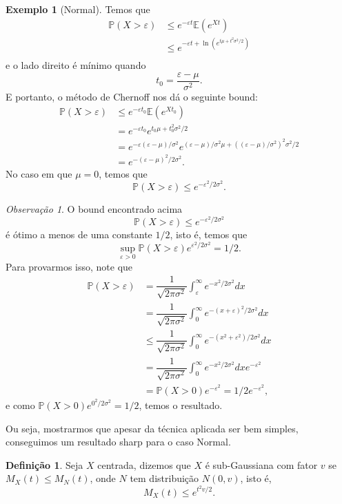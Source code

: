 \documentclass[12pt,a4paper,oneside]{book}
\theoremstyle{definition}
\newtheorem{definition}[theorem]{Defini\c{c}\~ao}
\newtheorem{example}[theorem]{Exemplo}
\theoremstyle{remark}
\newtheorem{remark}[theorem]{Observa\c{c}\~ao}
\numberwithin{equation}{section}
\newcommand{\e}{\varepsilon}
\newcommand{\E}{\mathbb{E}}
\newcommand{\pr}{\mathbb{P}}
\begin{document}
\begin{example}[Normal]
Temos que 
\begin{align*}
\pr(X>\e) & \leq  e^{-\e t}\E(e^{Xt})\\
	& \leq  e^{-\e t + \ln( e^{t\mu + t^2\sigma^2/2}) }\\
\end{align*} 
e o lado direito é mínimo quando 
$$t_0 = \dfrac{\e-\mu}{\sigma^2}.$$
E portanto, o método de Chernoff nos dá o seguinte bound:
\begin{align*}
\pr(X>\e) & \leq  e^{-\e t_0}\E(e^{Xt_0})\\
		& = e^{-\e t_0}e^{t_0\mu + t_0^2\sigma^2/2}\\
		& = e^{-\e (\e-\mu)/\sigma^2}e^{(\e-\mu)/\sigma^2\mu + ((\e-\mu)/\sigma^2)^2\sigma^2/2}\\
	& = e^{ -(\e-\mu)^2/2\sigma^2}.
\end{align*}
 No caso em que $\mu=0$, temos que
$$ \pr(X>\e) \leq e^{ -\e^2/2\sigma^2}.$$
\end{example}

\begin{tcolorbox}[colback = yellow!60]
\begin{remark}
O bound encontrado acima
$$ \pr(X>\e) \leq e^{ -\e^2/2\sigma^2}$$
é ótimo a menos de uma constante $1/2$, isto é, temos que
$$\sup_{\e>0} \pr(X>\e) e^{ \e^2/2\sigma^2} = 1/2.$$
Para provarmos isso, note que
\begin{align*}
\pr(X>\e) & = \dfrac{1}{\sqrt{2\pi \sigma^2}}\int_\e^\infty  e^{ -x^2/2\sigma^2}dx \\
& = \dfrac{1}{\sqrt{2\pi \sigma^2}}\int^\infty_0  e^{ -(x+\e)^2/2\sigma^2}dx \\
& \leq \dfrac{1}{\sqrt{2\pi \sigma^2}}\int^\infty_0  e^{ -(x^2+\e^2)/2\sigma^2}dx \\
& = \dfrac{1}{\sqrt{2\pi \sigma^2}}\int^\infty_0  e^{ -x^2/2\sigma^2}dx e^{-\e^2} \\
& = \pr(X>0)e^{-\e^2} = 1/2 e^{-\e^2},
\end{align*}
e como $\pr(X>0) e^{ 0^2/2\sigma^2} = 1/2$, temos o resultado.

Ou seja, mostrarmos que apesar da técnica aplicada ser bem simples, conseguimos um resultado sharp para o caso Normal.
\end{remark}
\end{tcolorbox}

\begin{definition}
Seja $X$ centrada, dizemos que $X$ é sub-Gaussiana com fator $v$ se $M_X(t)\leq M_N(t)$, onde $N$ tem distribuição $N(0,v)$, isto é,
$$M_X(t)\leq e^{t^2v/2}. $$
\end{definition}
\end{document}
